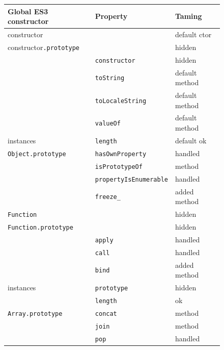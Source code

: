 \documentclass[letterpaper,twocolumn,10pt]{article}
\newcommand{\code}[1]{{\tt {#1}}}              %
\begin{document}
\begin{figure}
\begin{tabular}{lll}
  Global ES3 constructor       & Property                    & Taming \\
  \hline 
  constructor                  &                             & default ctor \\
  constructor\code{.prototype} &                             & hidden \\
                               & \code{constructor}          & hidden \\
                               & \code{toString}             & default method \\
                               & \code{toLocaleString}       & default method \\
                               & \code{valueOf}              & default method \\
  instances                    & \code{length}               & default ok \\
  \hline
  \code{Object.prototype}      & \code{hasOwnProperty}       & handled \\
                               & \code{isPrototypeOf}        & method \\
                               & \code{propertyIsEnumerable} & handled \\
                               & \code{freeze\_}             & added method \\
  \hline
  \code{Function}              &                             & hidden \\
  \code{Function.prototype}    &                             & hidden \\
                               & \code{apply}                & handled \\
                               & \code{call}                 & handled \\
                               & \code{bind}                 & added method \\
  instances                    & \code{prototype}            & hidden \\
                               & \code{length}               & ok \\
  \hline
  \code{Array.prototype}       & \code{concat}               & method \\
                               & \code{join}                 & method \\
                               & \code{pop}                  & handled \\

\end{tabular}
\end{figure}
\end{document}

